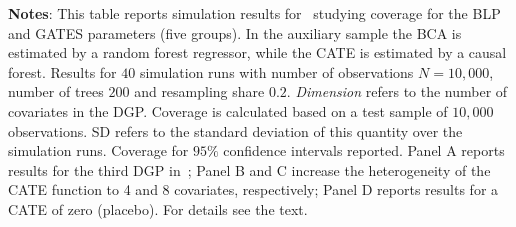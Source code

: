 \documentclass[11pt, a4paper, leqno]{article}
\begin{document}
\begin{table}
\begin{threeparttable}
        \begin{tablenotes}
            \small
            \item \textbf{Notes}: This table reports simulation results for~\cite{chernozhukov2023genml} studying coverage for the BLP and GATES parameters (five groups).
            In the auxiliary sample the BCA is estimated by a random forest regressor, while the CATE is estimated by a causal forest.
            Results for $40$ simulation runs with number of observations $N=10,000$, number of trees $200$ and resampling share $0.2$.
            \textit{Dimension} refers to the number of covariates in the DGP\@.
            Coverage is calculated based on a test sample of $10,000$ observations. SD refers to the standard deviation of this quantity over the simulation runs.
            Coverage for $95\%$ confidence intervals reported.
            Panel A reports results for the third DGP in~\cite{wager2018estimation}; Panel B and C increase the heterogeneity of the CATE function to 4 and 8 covariates, respectively; Panel D reports results for a CATE of zero (placebo).
            For details see the text.
        \end{tablenotes}
    \end{threeparttable}
\end{table}
\end{document}

